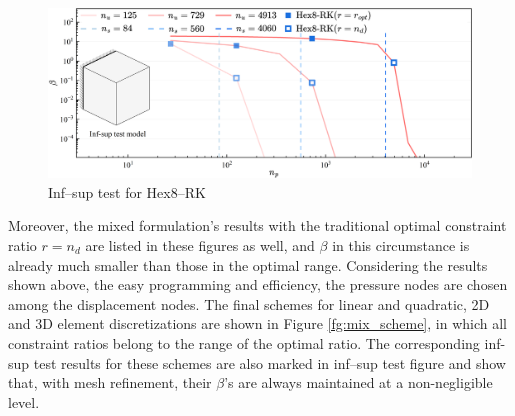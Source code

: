 \begin{figure}[H]
\centering
\includegraphics[width=\textwidth]{png/Hex8.png}\caption{Inf--sup test for Hex8--RK}\label{fg:infsup_convergence_3D_b}
\end{figure}

Moreover, the mixed formulation's results with the traditional optimal constraint ratio $r=n_d$ are listed in these figures as well, and $\beta$ in this circumstance is already much smaller than those in the optimal range. Considering the results shown above, the easy programming and efficiency, the pressure nodes are chosen among the displacement nodes. The final schemes for linear and quadratic, 2D and 3D element discretizations are shown in Figure \ref{fg:mix_scheme}, in which all constraint ratios belong to the range of the optimal ratio. The corresponding inf-sup test results for these schemes are also marked in inf--sup test figure and show that, with mesh refinement, their $\beta$'s are always maintained at a non-negligible level.

